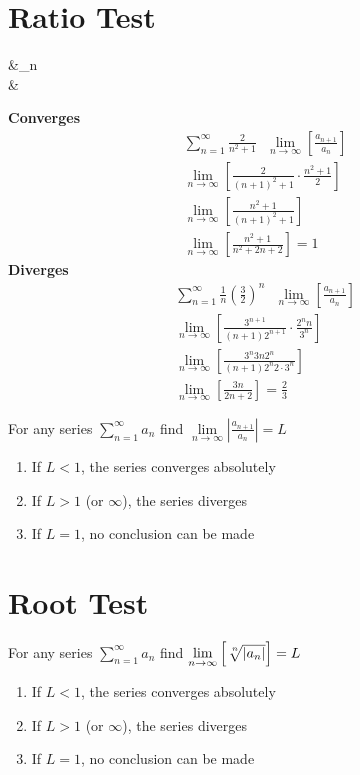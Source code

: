 \documentclass[a4paper]{article}
\begin{document}
\section{Ratio Test}
	{\setlength{\abovedisplayskip}{0pt}
	\begin{flalign*}
	&\lim\limits_{n\rightarrow\infty}{}\\
	&
	\end{flalign*}
	}{
	\setlength{\columnseprule}{.3pt}
	\begin{multicols}{2}
		{\centering \textbf{Converges}
		\begin{align*}
		&\sum\limits_{n=1}^{\infty}{\frac{2}{n^2+1}}\ \ \ \lim\limits_{n\rightarrow\infty}{\left[\frac{a_{n+1}}{a_n}\right]}\\
		&\lim\limits_{n\rightarrow\infty}{\left[\frac{2}{(n+1)^2+1}\cdot\frac{n^2+1}{2}\right]}\\
		&\lim\limits_{n\rightarrow\infty}{\left[\frac{n^2+1}{(n+1)^2+1}\right]}\\
		&\lim\limits_{n\rightarrow\infty}{\left[\frac{n^2+1}{n^2+2n+2}\right]}=1
		\end{align*}
		}
	\vfill\null
	\columnbreak
		{
		\centering \textbf{Diverges}
		\begin{align*}
		&\sum\limits_{n=1}^{\infty}{\frac{1}{n}\left(\frac{3}{2}\right)^{n}}\ \ \ \lim\limits_{n\rightarrow\infty}{\left[\frac{a_{n+1}}{a_n}\right]}\\
		&\lim\limits_{n\rightarrow\infty}{\left[\frac{3^{n+1}}{\left(n+1\right)2^{n+1}}\cdot\frac{2^n n}{3^n}\right]}\\
		&\lim\limits_{n\rightarrow\infty}{\left[\frac{3^{n}3n2^n}{(n+1)2^{n}2\cdot 3^{n}}\right]}\\
		&\lim\limits_{n\rightarrow\infty}{\left[\frac{3n}{2n+2}\right]}=\frac{2}{3}
		\end{align*}
		}
	\end{multicols}}
	For any series $\sum\limits_{n=1}^{\infty}{a_n}$ find $\lim\limits_{n\rightarrow\infty}{\left|\frac{a_{n+1}}{a_n}\right|=L}$
	\begin{enumerate}
	\item If $L<1$, the series converges absolutely
	\item If $L>1$ (or $\infty$), the series diverges
	\item If $L=1$, no conclusion can be made
	\end{enumerate}

\section{Root Test}
	For any series $\sum\limits_{n=1}^{\infty}{a_n}$ find $\lim\limits_{n\rightarrow\infty}{\left[\sqrt[\leftroot{-2}\uproot{2}n]{\left|a_n\right|}\right]=L}$
	\begin{enumerate}
		\item If $L<1$, the series converges absolutely
		\item If $L>1$ (or $\infty$), the series diverges
		\item If $L=1$, no conclusion can be made
	\end{enumerate}
\end{document}
